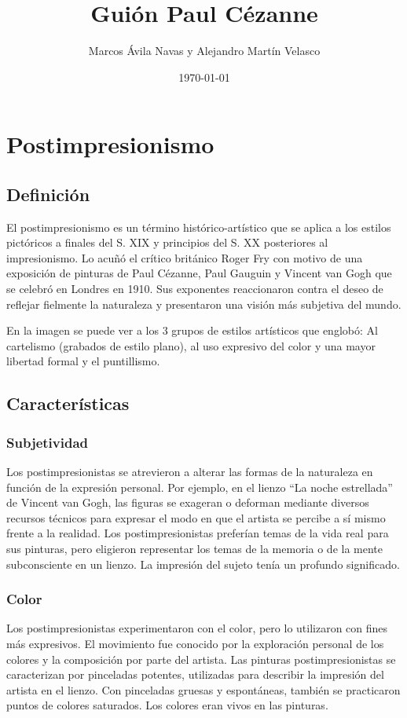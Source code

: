 \documentclass{article}
\title{Guión Paul Cézanne}
\date{\today}
\author{Marcos Ávila Navas y Alejandro Martín Velasco}
\begin{document}
\maketitle{}
\section{Postimpresionismo}
\subsection{Definición}
El postimpresionismo es un término histórico-artístico que se aplica a los estilos pictóricos a finales del S. XIX y principios del S. XX posteriores al 
impresionismo. Lo acuñó el crítico británico Roger Fry con motivo de una exposición de pinturas de Paul Cézanne, Paul Gauguin y Vincent van Gogh que se celebró en Londres en 1910. 
Sus exponentes reaccionaron contra el deseo de reflejar fielmente la naturaleza y presentaron una visión más subjetiva del mundo.

En la imagen se puede ver a los 3 grupos de estilos artísticos que englobó: Al cartelismo (grabados de estilo plano), al uso expresivo del color y 
una mayor libertad formal y el puntillismo.

\subsection{Características}
\subsubsection{Subjetividad}
Los postimpresionistas se atrevieron a alterar las formas de la naturaleza en función de la expresión personal. 
Por ejemplo, en el lienzo “La noche estrellada” de Vincent van Gogh, las figuras se exageran o deforman mediante diversos recursos técnicos para expresar el modo en que el artista 
se percibe a sí mismo frente a la realidad. Los postimpresionistas preferían temas de la vida real para sus pinturas, pero eligieron representar los temas de la memoria o de 
la mente subconsciente en un lienzo. La impresión del sujeto tenía un profundo significado.

\subsubsection{Color}
Los postimpresionistas experimentaron con el color, pero lo utilizaron con fines más expresivos. El movimiento fue conocido por la exploración personal de los colores 
y la composición por parte del artista. Las pinturas postimpresionistas se caracterizan por pinceladas potentes, utilizadas para describir la impresión del artista en el lienzo. 
Con pinceladas gruesas y espontáneas, también se practicaron puntos de colores saturados. Los colores eran vivos en las pinturas.
\end{document}
